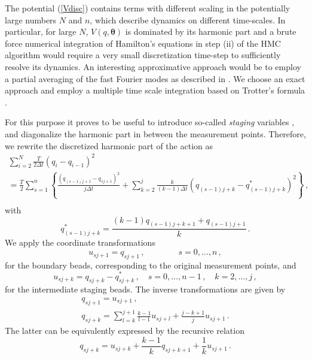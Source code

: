 \documentclass[12pt,a4paper,final]{iopart}
\newcommand{\bt}{\pmb\theta}
\begin{document}
The potential (\ref{Vdisc}) contains terms with different scaling in the potentially large numbers $N$ and $n$, which describe dynamics on different time-scales.
In particular, for large $N$, $V(q,\bt)$ is dominated by its harmonic part and a brute force numerical integration of Hamilton's equations in step (ii) of the HMC algorithm would require a very small discretization time-step to sufficiently resolve its dynamics.
An interesting approximative approach would be to employ a partial averaging of the fast Fourier modes as described in \cite{doll_1985_fourier}.
We choose an exact approach and employ a multiple time scale integration based on Trotter's formula \cite{tuckerman_1993}.

For this purpose it proves to be useful to introduce so-called \emph{staging} variables \cite{tuckerman_1992}, and diagonalize the harmonic part in between the measurement points.
Therefore, we rewrite the discretized harmonic part of the action as
\begin{eqnarray}
  \sum_{i=2}^{N}
  \frac{T}{2\Delta t}
  (q_i-q_{i-1})^2 \nonumber
  \\ =
  \frac{T}{2}
  \sum_{s=1}^{n}\left\{
    \frac{(q_{(s-1)j+1} - q_{sj+1})^2}{j\Delta t}
    +
    \sum_{k=2}^j
    \frac{k}{(k-1)\Delta t}
    (q_{(s-1)j+k}-q^*_{(s-1)j+k})^2
  \right\}\,,\nonumber
  \\
\end{eqnarray}
with
\begin{equation}
  q^*_{(s-1)j+k}
  =
  \frac{(k-1)q_{(s-1)j+k+1} + q_{(s-1)j+1} }{k}
  \,.
\end{equation}
We apply the coordinate transformations
\begin{equation}
  u_{sj+1} = q_{sj+1}\,, \qquad\qquad s=0,\dots,n\, ,
\end{equation}
for the boundary beads, corresponding to the original measurement points, and
\begin{equation}
  u_{sj+k} = q_{sj+k} - q^*_{sj+k}\,, \quad s=0,\dots,n-1\, , \quad k=2,\dots,j\, ,
\end{equation}
for the intermediate staging beads.
The inverse transformations are given by
\begin{eqnarray}
  q_{sj+1} = u_{sj+1}\,,
  \\
  q_{sj+k} = \sum_{l=k}^{j+1}\frac{k-1}{l-1}u_{sj+l}
  +\frac{j-k+1}{j}u_{sj+1}\,.
\end{eqnarray}
The latter can be equivalently expressed by the recursive relation
\begin{equation}
  q_{sj+k} = u_{sj+k} + \frac{k-1}{k} q_{sj+k+1}+ \frac{1}{k}u_{sj+1} \,.
\end{equation}
\end{document}
